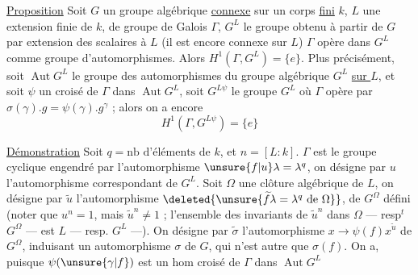 \uline{Proposition} Soit $G$ un groupe algébrique \uline{connexe} sur un corps \uline{fini} $k$, $L$ une extension finie de $k$, de groupe de Galois $\Gamma$, $G^L$ le groupe obtenu à partir de $G$ par extension des scalaires à $L$ (il est encore connexe sur $L$) $\Gamma$ opère dans $G^L$ comme groupe d'automorphismes.   Alors $H^1(\Gamma,G^L)=\{e\}$. Plus précisément,
soit $\operatorname{Aut}G^L$ le groupe des automorphismes du groupe algébrique $G^L$ \uline{sur $L$}, et soit $\psi$ un  croisé de $\Gamma$ dans $\operatorname{Aut}G^L$, soit $G^{L\psi}$ le groupe $G^L$  où $\Gamma$ opère par $\sigma(\gamma).g=\psi(\gamma).g^\gamma$ ; alors on a encore
\[
H^1(\Gamma,G^{L\psi})=\{e\}
\]

\uline{Démonstration} Soit $q=\text{nb d'éléments de }k$, et $n=[L:k]$.
$\Gamma$ est le groupe cyclique engendré par l'automorphisme $\unsure{f|u}\lambda=\lambda^q$, on désigne par $u$ l'automorphisme correspondant de $G^L$. Soit $\Omega$ une clôture algébrique de $L$, on désigne par $\widetilde u$ l'automorphisme $\deleted{\unsure{\widetilde f\lambda=\lambda^q\text{ de }\Omega}}$,     de $G^\Omega$  défini  (noter que $u^n=1$, mais $\widetilde u^n\ne1$ ; l'ensemble des invariants de $\widetilde u^n$ dans $\Omega$ --- resp$^t$ $G^\Omega$ --- est $L$ --- resp. $G^L$ ---).
On désigne par $\widetilde\sigma$ l'automorphisme $x\longrightarrow\psi(f)x^{\widetilde u}$ de $G^\Omega$, induisant un automorphisme $\sigma$ de $G$, qui n'est autre que $\sigma(f)$. On a, puisque $\psi(\unsure{\gamma|f})$ est un  hom croisé de $\Gamma$ dans $\operatorname{Aut}G^L$

